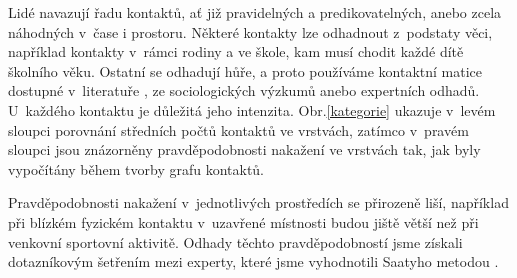Lidé navazují řadu kontaktů, ať již pravidelných a predikovatelných, anebo zcela náhodných v~čase i prostoru. 
Některé kontakty lze odhadnout z~podstaty věci, například kontakty v~rámci rodiny a ve škole, kam musí chodit každé dítě školního věku. Ostatní se odhadují hůře, a proto používáme kontaktní matice dostupné v~literatuře \cite{Prem_etal2017}, ze sociologických výzkumů anebo expertních odhadů. 
U~každého kontaktu je důležitá jeho intenzita. Obr.\ref{kategorie} ukazuje v~levém sloupci porovnání středních počtů kontaktů ve vrstvách, zatímco v~pravém sloupci jsou znázorněny pravděpodobnosti nakažení ve vrstvách tak, jak byly vypočítány během tvorby grafu kontaktů.


Pravděpodobnosti nakažení v~jednotlivých prostředích se přirozeně liší, například při blízkém fyzickém kontaktu v~uzavřené místnosti budou jiště větší než při venkovní sportovní aktivitě. Odhady těchto pravděpodobností jsme získali dotazníkovým šetřením mezi experty, které jsme vyhodnotili Saatyho metodou \cite{M-techrep2021}.

